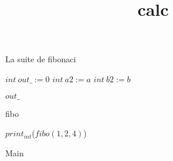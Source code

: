 \documentclass[8pt]{article}
\title{calc}
\begin{document}
\maketitle

La suite de fibonaci

\begin{algorithm}[H]
$int\:out\_ := 0$\;
$int\:a2 := a$\;
$int\:b2 := b$\;

\Return $ out\_ $\;
\caption{fibo}
\end{algorithm}

\begin{algorithm}[H]
$print_{int}$($ fibo(1, 2, 4) $)\;
\caption{Main}
\end{algorithm}
\end{document}
